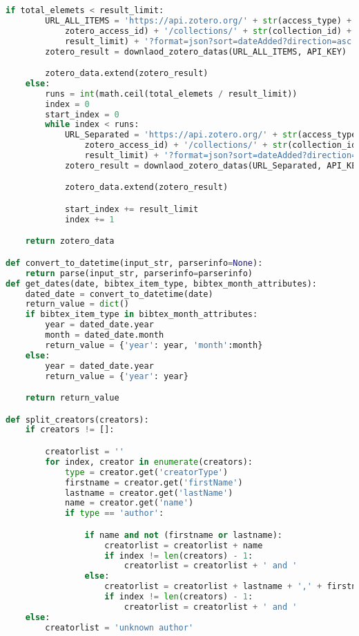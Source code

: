 \begin{lstlisting}[language=python, caption=Python LaTex - zotero.py - Zotero BibLaTex Importer,captionpos=b,label={lst:zotero},breaklines=true]
    if total_elemets < result_limit:
        URL_ALL_ITEMS = 'https://api.zotero.org/' + str(access_type) + '/' + str(
            zotero_access_id) + '/collections/' + str(collection_id) + '/items?limit=' + str(
            result_limit) + '?format=json?sort=dateAdded?direction=asc'
        zotero_result = downlaod_zotero_datas(URL_ALL_ITEMS, API_KEY)

        zotero_data.extend(zotero_result)
    else:
        runs = int(math.ceil(total_elemets / result_limit))
        index = 0
        start_index = 0
        while index < runs:
            URL_Separated = 'https://api.zotero.org/' + str(access_type) + '/' + str(
                zotero_access_id) + '/collections/' + str(collection_id) + '/items?limit=' + str(
                result_limit) + '?format=json?sort=dateAdded?direction=asc' + '&start=' + str(start_index)
            zotero_result = downlaod_zotero_datas(URL_Separated, API_KEY)

            zotero_data.extend(zotero_result)

            start_index += result_limit
            index += 1

    return zotero_data

def convert_to_datetime(input_str, parserinfo=None):
    return parse(input_str, parserinfo=parserinfo)
def get_dates(date, bibtex_item_type, bibtex_month_attributes):
    dated_date = convert_to_datetime(date)
    return_value = dict()
    if bibtex_item_type in bibtex_month_attributes:
        year = dated_date.year
        month = dated_date.month
        return_value = {'year': year, 'month':month}
    else:
        year = dated_date.year
        return_value = {'year': year}

    return return_value

def split_creators(creators):
    if creators != []:

        creatorlist = ''
        for index, creator in enumerate(creators):
            type = creator.get('creatorType')
            firstname = creator.get('firstName')
            lastname = creator.get('lastName')
            name = creator.get('name')
            if type == 'author':

                if name and not (firstname or lastname):
                    creatorlist = creatorlist + name
                    if index != len(creators) - 1:
                        creatorlist = creatorlist + ' and '
                else:
                    creatorlist = creatorlist + lastname + ',' + firstname
                    if index != len(creators) - 1:
                        creatorlist = creatorlist + ' and '
    else:
        creatorlist = 'unknown author'


\end{lstlisting}
